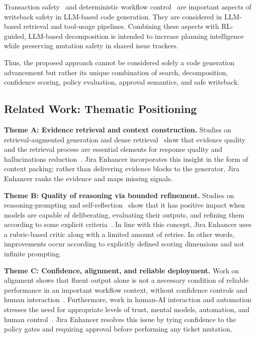\documentclass[manuscript,review]{acmart}
\begin{document}
Transaction safety~\cite{R88} and deterministic workflow control~\cite{R101} are important aspects of writeback safety in LLM-based code generation. They are considered in LLM-based retrieval and tool-usage pipelines. Combining these aspects with RL-guided, LLM-based decomposition is intended to increase planning intelligence while preserving mutation safety in shared issue trackers.

Thus, the proposed approach cannot be considered solely a code generation advancement but rather its unique combination of search, decomposition, confidence scoring, policy evaluation, approval semantics, and safe writeback.

\subsection{Related Work: Thematic Positioning}
\textbf{Theme A: Evidence retrieval and context construction.} Studies on retrieval-augmented generation and dense retrieval~\cite{R3,R32} show that evidence quality and the retrieval process are essential elements for response quality and hallucinations reduction~\cite{R22,R4,R6,R21}. Jira Enhancer incorporates this insight in the form of context packing: rather than delivering evidence blocks to the generator, Jira Enhancer ranks the evidence and maps missing signals.

\textbf{Theme B: Quality of reasoning via bounded refinement.} Studies on reasoning-prompting and self-reflection~\cite{R30,R14} show that it has positive impact when models are capable of deliberating, evaluating their outputs, and refining them according to some explicit criteria~\cite{R91,R89,R18}. In line with this concept, Jira Enhancer uses a rubric-based critic along with a limited amount of retries. In other words, improvements occur according to explicitly defined scoring dimensions and not infinite prompting.

\textbf{Theme C: Confidence, alignment, and reliable deployment.} Work on alignment shows that fluent output alone is not a necessary condition of reliable performance in an important workflow context, without confidence controls and human interaction~\cite{R90,R40,R13}. Furthermore, work in human-AI interaction and automation stresses the need for appropriate levels of trust, mental models, automation, and human control~\cite{R56,R57,R76,R75}. Jira Enhancer resolves this issue by tying confidence to the policy gates and requiring approval before performing any ticket mutation.
\end{document}
